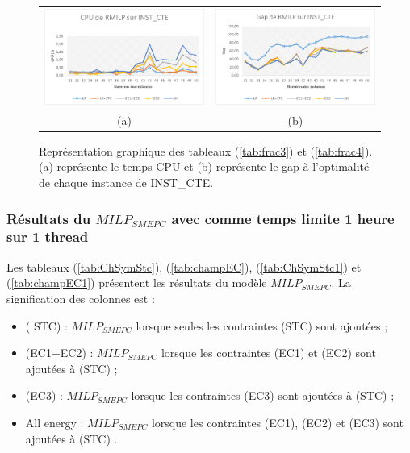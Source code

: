 {\begin{figure}[H]
	\centering
	\begin{tabular}{c c}
		\includegraphics[width=9cm]{images_these/CPU_RMILP_INST_CTE.pdf}&
		\includegraphics[width=9cm]{images_these/Gap_RMILP_INST_CTE.pdf}
		\\
		(a) & (b)
	\end{tabular}
	\caption[Représentation graphique du CPU et du gap des tableaux (\ref{tab:frac3}) et (\ref{tab:frac3})]{Représentation graphique des tableaux (\ref{tab:frac3}) et (\ref{tab:frac4}). (a) représente le temps CPU et (b) représente le gap à l'optimalité de chaque instance de INST\_CTE.}\label{gap_cpu_RMILP_INST_CTE}
\end{figure}

\subsubsection{Résultats du $MILP_{SMEPC}$ avec comme temps limite 1 heure sur 1 thread}
Les tableaux (\ref{tab:ChSymStc}), (\ref{tab:champEC}), (\ref{tab:ChSymStc1}) et (\ref{tab:champEC1}) présentent les résultats du modèle \textit{$MILP_{SMEPC}$}. La signification des colonnes est :
\begin{itemize}[label=$\square$]
	\item ( STC) : \textit{$MILP_{SMEPC}$} lorsque seules les contraintes (STC) sont ajoutées ;
	\item (EC1+EC2) : \textit{$MILP_{SMEPC}$} lorsque les contraintes (EC1) et (EC2) sont ajoutées à (STC) ; 
	\item (EC3) : \textit{$MILP_{SMEPC}$} lorsque les contraintes (EC3) sont ajoutées à (STC) ;
	\item All energy : \textit{$MILP_{SMEPC}$} lorsque les contraintes (EC1), (EC2) et (EC3) sont ajoutées à (STC) .
\end{itemize}

}
